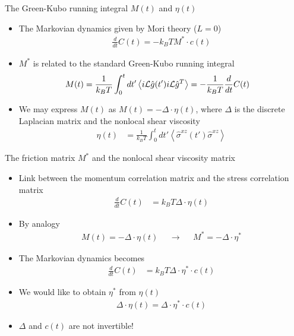 \documentclass{beamer}
\newcommand{\esc}{\!\cdot\!}
\newcommand{\llangle}{\left\langle}
\newcommand{\rrangle}{\right\rangle}
\begin{document}
\begin{frame}{The Green-Kubo running integral $M(t)$ and $\eta(t)$}
  \begin{itemize}
    \item The Markovian dynamics given by Mori theory ($L=0$)
\begin{align}
    \frac{d}{dt}C(t) = -k_BTM^*\cdot c(t)
    \nonumber
\end{align}
\item $M^*$ is related to the standard Green-Kubo running integral
\begin{align}
  M(t)&=\frac{1}{k_BT}\int_0^{t}dt' \llangle i{\cal L}\hat{g}(t')i{\cal L}\hat{g}^T\rrangle=-\frac{1}{k_BT}\frac{d}{dt}C(t)
\nonumber
\end{align}
\item We may express $M(t)$ as $M(t)=-\Delta\cdot\eta(t)$, where $\Delta$ is the discrete Laplacian matrix and the nonlocal shear viscosity
\begin{align}
  \eta(t) &=\frac{1}{k_BT}\int_0^{t}dt' 
  \llangle \hat{\sigma}^{xz}(t')\hat{\sigma}^{xz}\rrangle
\nonumber
\end{align}
\end{itemize}
\end{frame}

\begin{frame}{The friction matrix $M^*$ and the nonlocal shear viscosity matrix}
\begin{itemize}
\item Link between the momentum correlation matrix and the stress correlation matrix
  \begin{align}
  \frac{d}{dt}C(t)&= k_BT \Delta\esc \eta(t)
  \nonumber
  \end{align}
\item By analogy
  \begin{align}
   M(t)=-\Delta\cdot\eta(t)&& \rightarrow &&M^*=-\Delta\cdot\eta^*
  \nonumber
  \end{align}
\item The Markovian dynamics becomes
  \begin{align}
\frac{d}{dt}C(t)&=  k_BT\Delta\esc \eta^*\esc c(t)
\nonumber
\end{align}
\item We would like to obtain $\eta^*$ from $\eta(t)$
  \begin{align}
    \Delta\cdot\eta(t)=\Delta\cdot\eta^*\cdot c(t)
    \nonumber
  \end{align}
\item $\Delta$ and $c(t)$ are not invertible!
\end{itemize}
\end{frame}
\end{document}
